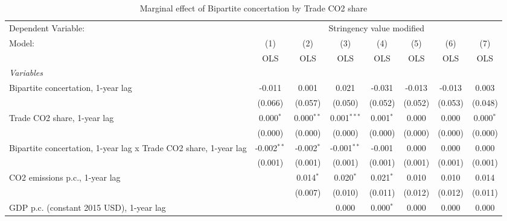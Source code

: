 
\begin{table}[htbp]
   \caption{Marginal effect of Bipartite concertation by Trade CO2 share}
   \centering
   \begin{tabular}{lccccccc}
      \toprule
      Dependent Variable: & \multicolumn{7}{c}{Stringency value modified}\\
      Model:                                                           & (1)           & (2)          & (3)           & (4)         & (5)     & (6)     & (7)\\  
                                                                       &  OLS          & OLS          & OLS           & OLS         & OLS     & OLS     & OLS\\  
      \midrule
      \emph{Variables}\\
      Bipartite concertation, 1-year lag                               & -0.011        & 0.001        & 0.021         & -0.031      & -0.013  & -0.013  & 0.003\\   
                                                                       & (0.066)       & (0.057)      & (0.050)       & (0.052)     & (0.052) & (0.053) & (0.048)\\   
      Trade CO2 share, 1-year lag                                      & 0.000$^{*}$   & 0.000$^{**}$ & 0.001$^{***}$ & 0.001$^{*}$ & 0.000   & 0.000   & 0.000$^{*}$\\   
                                                                       & (0.000)       & (0.000)      & (0.000)       & (0.000)     & (0.000) & (0.000) & (0.000)\\   
      Bipartite concertation, 1-year lag x Trade CO2 share, 1-year lag & -0.002$^{**}$ & -0.002$^{*}$ & -0.001$^{**}$ & -0.001      & 0.000   & 0.000   & 0.000\\   
                                                                       & (0.001)       & (0.001)      & (0.001)       & (0.001)     & (0.001) & (0.001) & (0.001)\\   
      CO2 emissions p.c., 1-year lag                                   &               & 0.014$^{*}$  & 0.020$^{*}$   & 0.021$^{*}$ & 0.010   & 0.010   & 0.014\\   
                                                                       &               & (0.007)      & (0.010)       & (0.011)     & (0.012) & (0.012) & (0.011)\\   
      GDP p.c. (constant 2015 USD), 1-year lag                         &               &              & 0.000         & 0.000$^{*}$ & 0.000   & 0.000   & 0.000\\   

\end{tabular}
\end{table}
